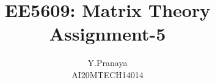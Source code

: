 \documentclass[journal,12pt,twocolumn]{IEEEtran}
\begin{document}
\makeatother
\let\StandardTheFigure\thefigure
\let\vec\mathbf
\renewcommand{\thefigure}{\theproblem}
\def\putbox#1#2#3{\makebox[0in][l]{\makebox[#1][l]{}\raisebox{\baselineskip}[0in][0in]{\raisebox{#2}[0in][0in]{#3}}}}
     \def\rightbox#1{\makebox[0in][r]{#1}}
     \def\centbox#1{\makebox[0in]{#1}}
     \def\topbox#1{\raisebox{-\baselineskip}[0in][0in]{#1}}
     \def\midbox#1{\raisebox{-0.5\baselineskip}[0in][0in]{#1}}
\vspace{3cm}
\title{EE5609: Matrix Theory\\
          Assignment-5\\}
\author{Y.Pranaya\\
AI20MTECH14014 }
%
%
%
% 
%
\end{document}
